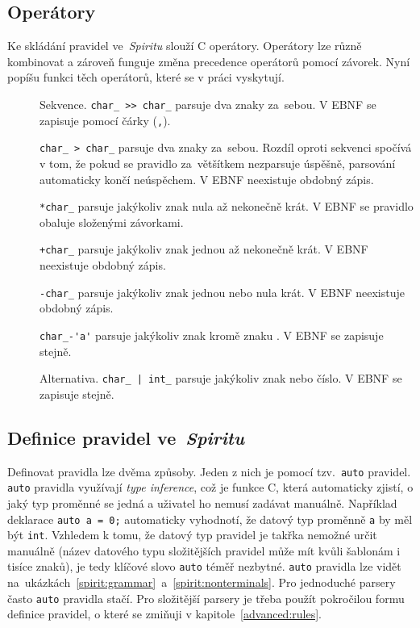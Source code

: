 \documentclass[thesis=B,czech,hidelinks]{FITthesis}[2019/03/06]
\newcommand{\Rplus}{\protect\hspace{-.1em}\protect\raisebox{.35ex}{\smaller{\smaller\textbf{+}}}}
\newcommand{\Cpp}{\mbox{C\Rplus\Rplus}\xspace}
\begin{document}
\subsection{Operátory}
Ke skládání pravidel ve~\textit{Spiritu} slouží \Cpp{} operátory. Operátory lze různě kombinovat a zároveň funguje změna precedence operátorů pomocí závorek. Nyní popíšu funkci těch operátorů, které se v práci vyskytují.
\begin{description}
    \item[\uv{\texttt{>>}}]{Sekvence. \verb¨char_ >> char_¨ parsuje dva znaky za~sebou. V EBNF se zapisuje pomocí čárky (\texttt{,}).}
    \item[\uv{\texttt{>}}]{\verb¨char_ > char_¨ parsuje dva znaky za~sebou. Rozdíl oproti sekvenci spočívá v tom, že pokud se pravidlo za~většítkem nezparsuje úspěšně, parsování automaticky končí neúspěchem. V EBNF neexistuje obdobný zápis.}
    \item[\uv{\texttt{*}}]{\verb¨*char_¨ parsuje jakýkoliv znak nula až nekonečně krát. V EBNF se pravidlo obaluje složenými závorkami.}
    \item[\uv{\texttt{+}}]{\verb¨+char_¨ parsuje jakýkoliv znak jednou až nekonečně krát. V EBNF neexistuje obdobný zápis.}
    \item[]{\verb¨-char_¨ parsuje jakýkoliv znak jednou nebo nula krát. V EBNF neexistuje obdobný zápis.}
    \item[]{\verb¨char_-'a'¨ parsuje jakýkoliv znak kromě znaku . V EBNF se zapisuje stejně.}
    \item[\uv{\texttt{|}}]{Alternativa. \verb¨char_ | int_¨ parsuje jakýkoliv znak nebo číslo. V EBNF se zapisuje stejně.}
\end{description}

\subsection{Definice pravidel ve~\textit{Spiritu}}
Definovat pravidla lze dvěma způsoby. Jeden z nich je pomocí tzv.\ \texttt{auto} pravidel. \texttt{auto} pravidla využívají \textit{type inference}, což je funkce \Cpp{}, která automaticky zjistí, o jaký typ proměnné se jedná a uživatel ho nemusí zadávat manuálně. Například deklarace \verb¨auto a = 0;¨ automaticky vyhodnotí, že datový typ proměnně \texttt{a} by měl být \texttt{int}. Vzhledem k tomu, že datový typ pravidel je takřka nemožné určit manuálně (název datového typu složitějších pravidel může mít kvůli šablonám i tisíce znaků), je tedy klíčové slovo \texttt{auto} téměř nezbytné. \texttt{auto} pravidla lze vidět na~ukázkách~\ref{spirit:grammar}~a~\ref{spirit:nonterminals}. Pro jednoduché parsery často \texttt{auto} pravidla stačí. Pro složitější parsery je třeba použít pokročilou formu definice pravidel, o které se zmiňuji v kapitole~\ref{advanced:rules}.
\end{document}
